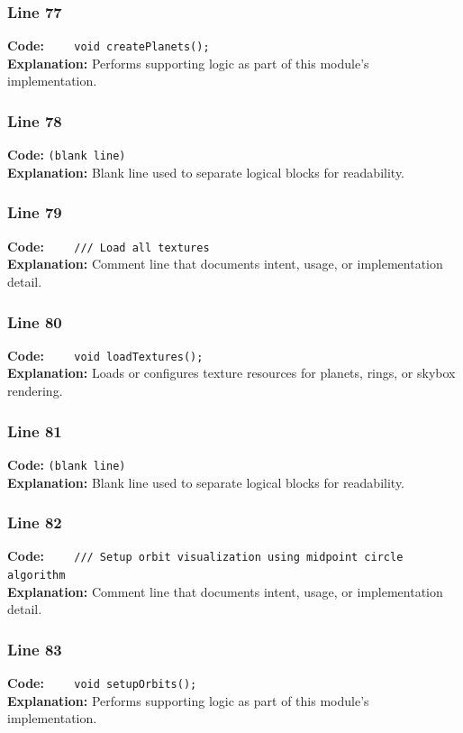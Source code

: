 \documentclass[11pt,a4paper]{article}
\begin{document}
\subsubsection*{Line 77}
\textbf{Code:} \verb|    void createPlanets();|\\
\textbf{Explanation:} Performs supporting logic as part of this module's implementation.

\subsubsection*{Line 78}
\textbf{Code:} \texttt{(blank line)}\\
\textbf{Explanation:} Blank line used to separate logical blocks for readability.

\subsubsection*{Line 79}
\textbf{Code:} \verb|    /// Load all textures|\\
\textbf{Explanation:} Comment line that documents intent, usage, or implementation detail.

\subsubsection*{Line 80}
\textbf{Code:} \verb|    void loadTextures();|\\
\textbf{Explanation:} Loads or configures texture resources for planets, rings, or skybox rendering.

\subsubsection*{Line 81}
\textbf{Code:} \texttt{(blank line)}\\
\textbf{Explanation:} Blank line used to separate logical blocks for readability.

\subsubsection*{Line 82}
\textbf{Code:} \verb|    /// Setup orbit visualization using midpoint circle algorithm|\\
\textbf{Explanation:} Comment line that documents intent, usage, or implementation detail.

\subsubsection*{Line 83}
\textbf{Code:} \verb|    void setupOrbits();|\\
\textbf{Explanation:} Performs supporting logic as part of this module's implementation.
\end{document}
